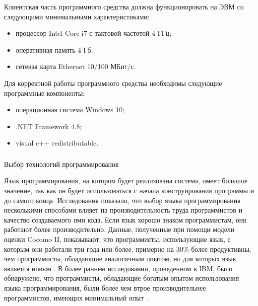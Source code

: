 Клиентская часть программного средства должна функционировать на ЭВМ со следующими минимальными характеристиками:
\begin{itemize}
	\item процессор Intel Core i7 с тактовой частотой 4 ГГц;
	\item оперативная память 4 Гб;
	\item сетевая карта Ethernet 10/100 МБит/с.
\end{itemize} 

Для корректной работы программного средства необходимы следующие программные компоненты:
\begin{itemize}
    \item операционная система Windows 10;
	\item .NET Framework 4.8;
	\item visual c++ redistributable.
\end{itemize} 

\subsubsection{}Выбор технологий программирования
\label{sec:analysis:requirements:language}

Язык программирования, на котором будет реализована система, имеет большое значение, так как он будет использоваться с начала конструирования программы и до самого конца.
Исследования показали, что выбор языка программирования несколькими способами влияет на производительность труда программистов и качество создаваемого ими кода. Если язык
хорошо знаком программистам, они работают более производительно. Данные, полученные при помощи модели оценки Cocomo II, показывают, что программисты, использующие язык, 
с которым они работали три года или более, примерно на 30\% более продуктивны, чем программисты, обладающие аналогичным опытом, но для которых язык является новым \cite{software_cost_estimation}.
В более раннем исследовании, проведенном в IBM, было обнаружено, что программисты, обладающие богатым опытом использования языка программирования, были более чем втрое 
производительнее программистов, имеющих минимальный опыт \cite{method_of_programming_measurement_and_estimation}.


